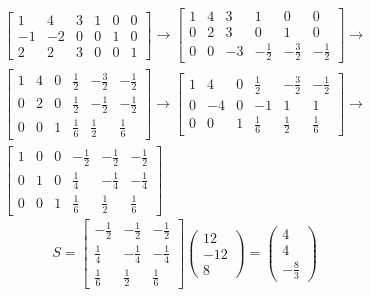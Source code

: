 \documentclass[11pt]{homework}
\begin{document}
    \begin{multline}
        \left[\begin{array}{ccc|ccc}
        1 & 4 & 3 & 1 & 0 & 0 \\ 
        -1 & -2 & 0 & 0 & 1 & 0 \\ 
        2 & 2 & 3 & 0 & 0 & 1
        \end{array}\right]\to
        \left[\begin{array}{ccc|ccc}
        1 & 4 & 3 & 1 & 0 & 0 \\ 
        0 & 2 & 3 & 0 & 1 & 0 \\ 
        0 & 0 & -3 & -\frac{1}{2} & -\frac{3}{2} & -\frac{1}{2}
        \end{array}\right]\to\\
        \left[\begin{array}{ccc|ccc}
        1 & 4 & 0 & \frac{1}{2} & -\frac{3}{2} & -\frac{1}{2} \\ 
        0 & 2 & 0 & \frac{1}{2} & -\frac{1}{2} & -\frac{1}{2} \\ 
        0 & 0 & 1 & \frac{1}{6} & \frac{1}{2} & \frac{1}{6}
        \end{array}\right]\to
        \left[\begin{array}{ccc|ccc}
        1 & 4 & 0 & \frac{1}{2} & -\frac{3}{2} & -\frac{1}{2} \\ 
        0 & -4 & 0 & -1 & 1 & 1 \\ 
        0 & 0 & 1 & \frac{1}{6} & \frac{1}{2} & \frac{1}{6}
        \end{array}\right]\to\\
        \left[\begin{array}{ccc|ccc}
        1 & 0 & 0 & -\frac{1}{2} & -\frac{1}{2} & -\frac{1}{2} \\ 
        0 & 1 & 0 & \frac{1}{4} & -\frac{1}{4} & -\frac{1}{4} \\ 
        0 & 0 & 1 & \frac{1}{6} & \frac{1}{2} & \frac{1}{6}
        \end{array}\right]
    \end{multline}
    \begin{equation}
        S=
        \left[\begin{array}{ccc}
            -\frac{1}{2} & -\frac{1}{2} & -\frac{1}{2} \\ 
            \frac{1}{4} & -\frac{1}{4} & -\frac{1}{4} \\ 
            \frac{1}{6} & \frac{1}{2} & \frac{1}{6}
            \end{array}\right]
            \begin{pmatrix}
            12 \\ 
            -12 \\ 
            8
            \end{pmatrix}=
            \begin{pmatrix}
            4 \\ 
            4 \\ 
            -\frac{8}{3}
            \end{pmatrix}
    \end{equation}
\end{document}
